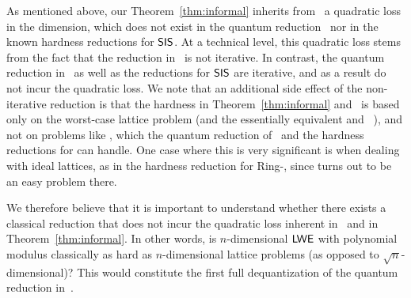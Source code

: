 

As mentioned above, our Theorem~\ref{thm:informal} inherits from~\cite{DBLP:conf/stoc/Peikert09}
a quadratic loss in the dimension, which does not exist in the quantum reduction~\cite{DBLP:journals/jacm/Regev09}
nor in the known hardness reductions for $\mathsf{SIS}$. 
At a technical level, this quadratic loss stems from the fact that the reduction in~\cite{DBLP:conf/stoc/Peikert09} is not iterative. In contrast,
the quantum reduction in~\cite{DBLP:journals/jacm/Regev09} as well as the reductions for $\mathsf{SIS}$ are iterative, and as a result do not incur
the quadratic loss. We note that an additional side effect of the non-iterative reduction is that the hardness in Theorem~\ref{thm:informal} 
and~\cite{DBLP:conf/stoc/Peikert09} is based only on the worst-case lattice problem \gapsvp (and the essentially equivalent \bdd and \usvp~\cite{DBLP:conf/crypto/LyubashevskyM09}), and not on problems like \sivp, which the quantum reduction of~\cite{DBLP:journals/jacm/Regev09} and the hardness
reductions for \sis can handle. One case where this is very significant is when dealing with ideal lattices, as in the hardness 
reduction for Ring-\lwe, since \gapsvp turns out to be an easy problem there. 

We therefore believe that it is important to understand whether there exists a classical
reduction that does not incur the quadratic loss inherent in~\cite{DBLP:conf/stoc/Peikert09}
and in Theorem~\ref{thm:informal}.
In other words, is $n$-dimensional $\mathsf{LWE}$ with polynomial modulus classically as hard as $n$-dimensional
lattice problems (as opposed to $\sqrt{n}$-dimensional)? This would constitute
the first full dequantization of the quantum reduction in~\cite{DBLP:journals/jacm/Regev09}.

